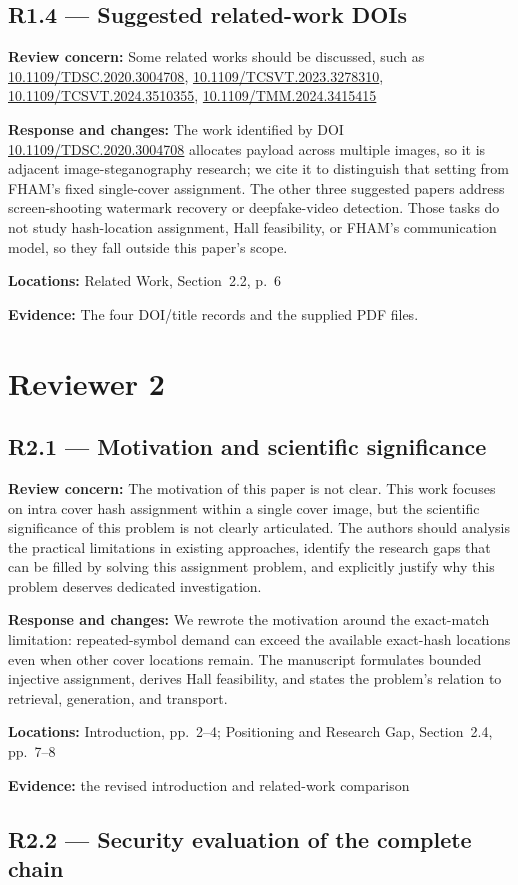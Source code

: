 \documentclass[12pt,a4paper]{article}
\newcommand{\revcomment}[1]{\par\medskip\noindent\textbf{Review concern:} #1\par\smallskip}
\newcommand{\responsechanges}[1]{\par\noindent\textbf{Response and changes:} #1\par}
\newcommand{\locations}[1]{\par\noindent\textbf{Locations:} #1\par}
\newcommand{\evidence}[1]{\par\noindent\textbf{Evidence:} #1\par\smallskip}
\begin{document}
\subsection*{R1.4 --- Suggested related-work DOIs}

\revcomment{Some related works should be discussed, such as \url{10.1109/TDSC.2020.3004708}, \url{10.1109/TCSVT.2023.3278310}, \url{10.1109/TCSVT.2024.3510355}, \url{10.1109/TMM.2024.3415415}}
\responsechanges{The work identified by DOI \url{10.1109/TDSC.2020.3004708} allocates payload across multiple images, so it is adjacent image-steganography research; we cite it to distinguish that setting from FHAM's fixed single-cover assignment. The other three suggested papers address screen-shooting watermark recovery or deepfake-video detection. Those tasks do not study hash-location assignment, Hall feasibility, or FHAM's communication model, so they fall outside this paper's scope.}
\locations{Related Work, Section~2.2, p.~6}
\evidence{The four DOI/title records and the supplied PDF files.}

\section*{Reviewer 2}

\subsection*{R2.1 --- Motivation and scientific significance}

\revcomment{The motivation of this paper is not clear. This work focuses on intra cover hash assignment within a single cover image, but the scientific significance of this problem is not clearly articulated. The authors should analysis the practical limitations in existing approaches, identify the research gaps that can be filled by solving this assignment problem, and explicitly justify why this problem deserves dedicated investigation.}
\responsechanges{We rewrote the motivation around the exact-match limitation: repeated-symbol demand can exceed the available exact-hash locations even when other cover locations remain. The manuscript formulates bounded injective assignment, derives Hall feasibility, and states the problem's relation to retrieval, generation, and transport.}
\locations{Introduction, pp.~2--4; Positioning and Research Gap, Section~2.4, pp.~7--8}
\evidence{the revised introduction and related-work comparison}

\subsection*{R2.2 --- Security evaluation of the complete chain}
\end{document}
